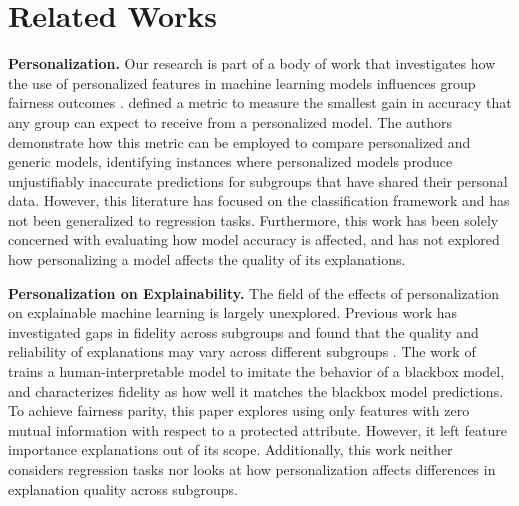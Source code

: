 \section{Related Works}\label{sec:related}

\textbf{Personalization.} Our research is part of a body of work that investigates how the use of personalized features in machine learning models influences group fairness outcomes \citep{suriyakumar2023personalizationharmsreconsideringuse}. \citet{monteiro2022epistemic} defined a metric to measure the smallest gain in accuracy that any group can expect to receive from a personalized model. The authors demonstrate how this metric can be employed to compare personalized and generic models, identifying instances where personalized models produce unjustifiably inaccurate predictions for subgroups that have shared their personal data. However, this literature has focused on the classification framework and has not been generalized to regression tasks. Furthermore, this work has been solely concerned with evaluating how model accuracy is affected, and has not explored how personalizing a model affects the quality of its explanations.

\textbf{Personalization on Explainability.} The field of the effects of personalization on explainable machine learning is largely unexplored. Previous work has investigated gaps in fidelity across subgroups and found that the quality and reliability of explanations may vary across different subgroups \citep{Balagopalan_2022}. The work of \citet{Balagopalan_2022} trains a human-interpretable model to imitate the behavior of a blackbox model, and characterizes fidelity as how well it matches the blackbox model predictions. To achieve fairness parity, this paper explores using only features with zero mutual information with respect to a protected attribute. However, it left feature importance explanations out of its scope. Additionally, this work neither considers regression tasks nor looks at how personalization affects differences in explanation quality across subgroups.

